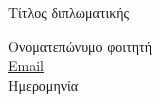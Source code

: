 \clearpage
\thispagestyle{empty}

\vspace*{\fill}
\begin{center}
    \Huge Τίτλος διπλωματικής \\
    \vspace{2cm}

    \normalsize Ονοματεπώνυμο φοιτητή \\
    \normalsize \href{mailto:address}{Email} \\

    \vspace{1cm}
    \normalsize Ημερομηνία\\
\end{center}

\vspace*{\fill}


